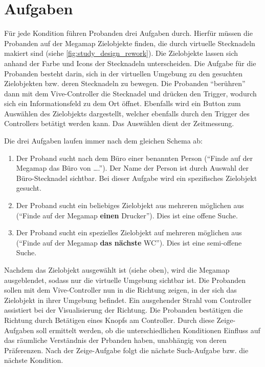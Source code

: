 \documentclass[
    draft=false,
    paper=a4,
    fontsize=11pt,
    twoside=false,
    captions=tableheading,
    british, ngerman,
]{scrartcl}
\begin{document}
\section{Aufgaben}
\label{sec:tasks}
Für jede Kondition führen Probanden drei Aufgaben durch.
Hierfür müssen die Probanden auf der Megamap Zielobjekte finden, die durch virtuelle Stecknadeln makiert sind (siehe \autoref{fig:study_design_rework}).
Die Zielobjekte lassen sich anhand der Farbe und Icons der Stecknadeln unterscheiden.
Die Aufgabe für die Probanden besteht darin, sich in der virtuellen Umgebung zu den gesuchten Zielobjekten bzw. deren Stecknadeln zu bewegen.
Die Probanden \enquote{berühren} dann mit dem Vive-Controller die Stecknadel und drücken den Trigger, wodurch sich ein Informationsfeld zu dem Ort öffnet.
Ebenfalls wird ein Button zum Auswählen des Zielobjekts dargestellt, welcher ebenfalls durch den Trigger des Controllers betätigt werden kann.
Das Auswählen dient der Zeitmessung.

Die drei Aufgaben laufen immer nach dem gleichen Schema ab:
\begin{enumerate}
    \item Der Proband sucht nach dem Büro einer benannten Person (\enquote{Finde auf der Megamap das Büro von \dots.}). %
    Der Name der Person ist durch Auswahl der Büro-Stecknadel sichtbar. %
    Bei dieser Aufgabe wird ein spezifisches Zielobjekt gesucht.
    \item Der Proband sucht ein beliebiges Zielobjekt aus mehreren möglichen aus (\enquote{Finde auf der Megamap \textbf{einen} Drucker}). %
    Dies ist eine offene Suche.
    \item Der Proband sucht ein spezielles Zielobjekt auf mehreren möglichen aus (\enquote{Finde auf der Megamap \textbf{das nächste} WC}). %
    Dies ist eine semi-offene Suche.
\end{enumerate}
Nachdem das Zielobjekt ausgewählt ist (siehe oben), wird die Megamap ausgeblendet, sodass nur die virtuelle Umgebung sichtbar ist.
Die Probanden sollen mit dem Vive-Controller nun in die Richtung zeigen, in der sich das Zielobjekt in ihrer Umgebung befindet.
Ein ausgehender Strahl vom Controller assistiert bei der Visualisierung der Richtung.
Die Probanden bestätigen die Richtung durch Betätigen eines Knopfs am Controller.
Durch diese Zeige-Aufgaben soll ermittelt werden, ob die unterschiedlichen Konditionen Einfluss auf das räumliche Verständnis der Prbanden haben, unabhängig von deren Präferenzen.
Nach der Zeige-Aufgabe folgt die nächste Such-Aufgabe bzw. die nächste Kondition.
\end{document}
